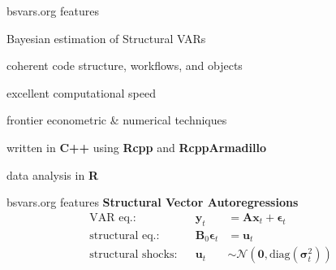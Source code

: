 \documentclass[aspectratio=1610,notes,blackandwhite,mathsans,usenames,dvipsnames]{beamer}
\begin{document}
	
	\begin{frame}{\huge bsvars.org features}
		\Large
		
		\begin{itemize}[label=$\blacktriangleright$]
		{\color{lig}
			\item Bayesian estimation of Structural VARs\\[1ex]
			\item coherent code structure, workflows, and objects\\[1ex]
			\item  excellent computational speed\\[1ex]
			\item  frontier econometric \& numerical techniques\\[1ex]
			\item  written in \textbf{C++} using \textbf{Rcpp} and \textbf{RcppArmadillo}\\[1ex]
			\item data analysis in \textbf{R}
		}	
		\end{itemize}
	\end{frame}



	\begin{frame}{\huge bsvars.org features}
		\Large
		\textbf{Structural Vector Autoregressions}
		\begin{align*}
		\text{VAR eq.:}&& \mathbf{y}_t &= \mathbf{Ax}_t + \boldsymbol\epsilon_t\\[1ex]
		\text{structural eq.:}&& \mathbf{B}_0\boldsymbol\epsilon_t &= \mathbf{u}_t \\[1ex]
		\text{structural shocks:}&& \mathbf{u}_t &\sim\mathcal{N}(\mathbf{0}, \text{diag}\left(\boldsymbol\sigma^2_t\right) ) \\
		\end{align*}
		
	\end{frame}



	
\end{document}
